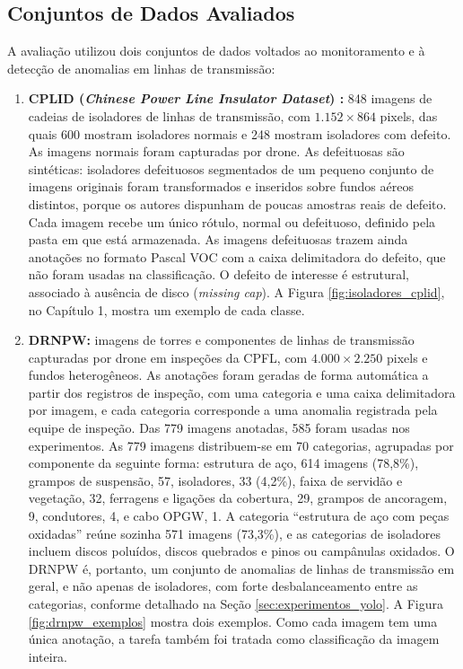 \subsection{Conjuntos de Dados Avaliados}
A avaliação utilizou dois conjuntos de dados voltados ao monitoramento e à detecção de anomalias em linhas de transmissão:
\begin{enumerate}
    \item \textbf{CPLID (\textit{Chinese Power Line Insulator Dataset}) \cite{tao2020cplid}:} 848 imagens de cadeias de isoladores de linhas de transmissão, com $1.152 \times 864$ pixels, das quais 600 mostram isoladores normais e 248 mostram isoladores com defeito. As imagens normais foram capturadas por drone. As defeituosas são sintéticas: isoladores defeituosos segmentados de um pequeno conjunto de imagens originais foram transformados e inseridos sobre fundos aéreos distintos, porque os autores dispunham de poucas amostras reais de defeito. Cada imagem recebe um único rótulo, normal ou defeituoso, definido pela pasta em que está armazenada. As imagens defeituosas trazem ainda anotações no formato Pascal VOC com a caixa delimitadora do defeito, que não foram usadas na classificação. O defeito de interesse é estrutural, associado à ausência de disco (\textit{missing cap}). A Figura \ref{fig:isoladores_cplid}, no Capítulo 1, mostra um exemplo de cada classe.
    \item \textbf{DRNPW:} imagens de torres e componentes de linhas de transmissão capturadas por drone em inspeções da CPFL, com $4.000 \times 2.250$ pixels e fundos heterogêneos. As anotações foram geradas de forma automática a partir dos registros de inspeção, com uma categoria e uma caixa delimitadora por imagem, e cada categoria corresponde a uma anomalia registrada pela equipe de inspeção. Das 779 imagens anotadas, 585 foram usadas nos experimentos. As 779 imagens distribuem-se em 70 categorias, agrupadas por componente da seguinte forma: estrutura de aço, 614 imagens (78,8\%), grampos de suspensão, 57, isoladores, 33 (4,2\%), faixa de servidão e vegetação, 32, ferragens e ligações da cobertura, 29, grampos de ancoragem, 9, condutores, 4, e cabo OPGW, 1. A categoria ``estrutura de aço com peças oxidadas'' reúne sozinha 571 imagens (73,3\%), e as categorias de isoladores incluem discos poluídos, discos quebrados e pinos ou campânulas oxidados. O DRNPW é, portanto, um conjunto de anomalias de linhas de transmissão em geral, e não apenas de isoladores, com forte desbalanceamento entre as categorias, conforme detalhado na Seção \ref{sec:experimentos_yolo}. A Figura \ref{fig:drnpw_exemplos} mostra dois exemplos. Como cada imagem tem uma única anotação, a tarefa também foi tratada como classificação da imagem inteira.
\end{enumerate}

